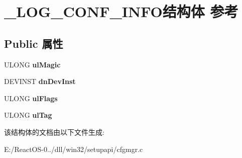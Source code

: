 \hypertarget{struct___l_o_g___c_o_n_f___i_n_f_o}{}\section{\+\_\+\+L\+O\+G\+\_\+\+C\+O\+N\+F\+\_\+\+I\+N\+F\+O结构体 参考}
\label{struct___l_o_g___c_o_n_f___i_n_f_o}
\subsection*{Public 属性}
\begin{DoxyCompactItemize}
\item 
\mbox{\label{struct___l_o_g___c_o_n_f___i_n_f_o_ab379d43a7a08be471b6490ef614af21d}} 
U\+L\+O\+NG {\bfseries ul\+Magic}
\item 
\mbox{\label{struct___l_o_g___c_o_n_f___i_n_f_o_a6b7c3b773b82d7d84b7b66b1100d1d17}} 
D\+E\+V\+I\+N\+ST {\bfseries dn\+Dev\+Inst}
\item 
\mbox{\label{struct___l_o_g___c_o_n_f___i_n_f_o_a2da3b355c0d908fd33d8340bcc0b62c4}} 
U\+L\+O\+NG {\bfseries ul\+Flags}
\item 
\mbox{\label{struct___l_o_g___c_o_n_f___i_n_f_o_a307926cf179bc34c31da63e91fa0fa79}} 
U\+L\+O\+NG {\bfseries ul\+Tag}
\end{DoxyCompactItemize}


该结构体的文档由以下文件生成\+:\begin{DoxyCompactItemize}
\item 
E\+:/\+React\+O\+S-\/0../dll/win32/setupapi/cfgmgr.\+c\end{DoxyCompactItemize}
